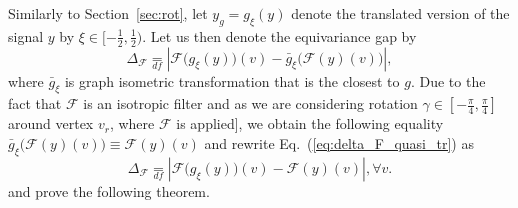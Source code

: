 \documentclass[10pt,journal,compsoc]{IEEEtran}
\newcommand{\renata}[1]{\textcolor{black}{#1}}
\newcommand{\df}{\mathop{=}\limits_{df}}
\newcommand{\mF}{\mathcal{F}}
\begin{document}
	 Similarly to Section~\ref{sec:rot}, let $y_g = g_\xi(y)$ denote the translated version of the signal $y$ by $\xi \in [-\frac{1}{2},\frac{1}{2})$. Let us then denote the equivariance gap by
	 \begin{equation}
	 \Delta_\mathcal{F} \df \left| \mathcal{F}\big(g_{\xi} (y)\big)(v) - \bar{g}_{\xi}\big(\mathcal{F}(y)(v)\big) \right| ,
	 \label{eq:delta_F_quasi_tr}
	 \end{equation}
	 where $\bar{g}_{\xi}$ is graph isometric transformation that is the closest to $g$. Due to the fact that $\mF$ is an isotropic filter and as we are considering rotation $\gamma \in [-\frac{\pi}{4}, \frac{\pi}{4}]$ around vertex $v_r$, where $\mF$ is applied], we obtain the following equality $\bar{g}_{\xi}\big(\mF(y)(v)\big) \equiv \mF(y)(v)$ and rewrite Eq.~(\ref{eq:delta_F_quasi_tr}) as
	 \begin{equation}
	 \Delta_\mathcal{F} \df \left| \mathcal{F}\big(g_{\xi} (y)\big)(v) - \mathcal{F}(y)(v) \right|, \forall v.
	 \label{eq:equivariance_ref_trans_notations_smpl}
	 \end{equation}
	\noindent
	and prove the following theorem.


\end{document}
